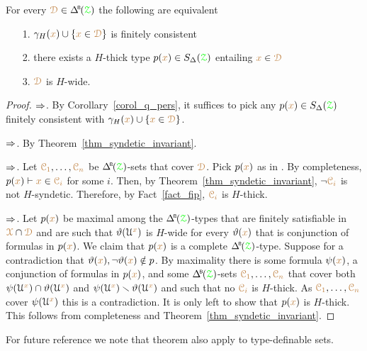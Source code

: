 \begin{theorem}\label{thm_syndetic_invariant2}
  For every $\mrD\in\BDelta(\grZ)$ the following are equivalent 
  \begin{itemize}
    \item[1.] $\gamma_H({\color{brown} x})\cup\{{\color{brown} x}\in{\color{brown}\EuScript D}\}$ is finitely consistent
    \item[2.] there exists a $H$-thick type $p({\color{brown} x})\in S_\Delta({\color{green}\EuScript Z})$ entailing ${\color{brown} x}\in{\color{brown}\EuScript D}$
    \item[3.] ${\color{brown}\EuScript D}$ is $H$-wide.\smallskip
  \end{itemize}
\end{theorem}

\begin{proof}
  $\Rightarrow$.
  By Corollary~\ref{corol_q_pers}, it suffices to pick any $p({\color{brown} x})\in S_\Delta({\color{green}\EuScript Z})$ finitely consistent with $\gamma_H({\color{brown} x})\cup\{{\color{brown} x}\in{\color{brown}\EuScript D}\}$.

  $\Rightarrow$.
  By Theorem~\ref{thm_syndetic_invariant}.

  $\Rightarrow$.
  Let ${\color{brown}\EuScript C_1},\dots,{\color{brown}\EuScript C_n}$ be $\BDelta({\grZ})$-sets that cover ${\color{brown}\EuScript D}$.
  Pick $p({\color{brown} x})$ as in .
  By completeness, $p({\color{brown} x})\vdash {\color{brown}x}\in{\color{brown}\EuScript C_i}$ for some $i$.
  Then, by Theorem~\ref{thm_syndetic_invariant}, $\neg{\color{brown}\EuScript C_i}$ is not $H$-syndetic.
  Therefore, by Fact~\ref{fact_fip}, ${\color{brown}\EuScript C_i}$ is $H$-thick.

  $\Rightarrow$.
  Let $p({\color{brown} x})$ be maximal among the $\BDelta({\grZ})$-types that are finitely satisfiable in ${\color{brown}\EuScript X}\cap{\color{brown}\EuScript D}$ and are such that $\vartheta(\EuScript U^{\color{brown} x})$ is $H$-wide for every $\vartheta({\color{brown} x})$ that is conjunction of formulas in $p({\color{brown} x})$.
  We claim that $p({\color{brown} x})$ is a complete $\BDelta({\grZ})$-type.
  Suppose for a contradiction that $\vartheta({\color{brown} x}),\neg\vartheta({\color{brown} x})\notin p$.
  By maximality there is some formula $\psi({\color{brown} x})$, a conjunction of formulas in $p({\color{brown} x})$, and some $\BDelta({\grZ})$-sets ${\color{brown}\EuScript C_1},\dots,{\color{brown}\EuScript C_n}$ that cover both $\psi(\EuScript U^{\color{brown} x})\cap\vartheta(\EuScript U^{\color{brown} x})$ and $\psi(\EuScript U^{\color{brown} x})\smallsetminus\vartheta(\EuScript U^{\color{brown} x})$ and such that no ${\color{brown}\EuScript C_i}$ is $H$-thick.
  As ${\color{brown}\EuScript C_1},\dots,{\color{brown}\EuScript C_n}$ cover $\psi(\EuScript U^{\color{brown} x})$ this is a contradiction.
  It is only left to show that $p({\color{brown} x})$ is $H$-thick.
  This follows from completeness and Theorem~\ref{thm_syndetic_invariant}.
\end{proof}

For future reference we note that theorem also apply to type-definable sets.


